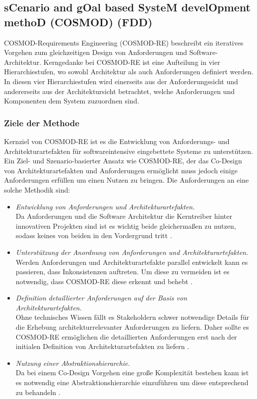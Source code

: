 \subsection{sCenario and gOal based SysteM develOpment methoD (COSMOD) (FDD)}\label{scgo}
COSMOD-Requirements Engineering (COSMOD-RE) beschreibt ein iteratives Vorgehen zum gleichzeitigen Design von Anforderungen und Software-Architektur. Kerngedanke bei COSMOD-RE ist eine Aufteilung in vier Hierarchiestufen, wo sowohl Architektur als auch Anforderungen definiert werden. In diesen vier Hierarchiestufen wird einerseits aus der Anforderungssicht und andererseits aus der Architektursicht betrachtet, welche Anforderungen und Komponenten dem System zuzuordnen sind.\\

\subsubsection{Ziele der Methode}
Kernziel von COSMOD-RE ist es die Entwicklung von Anforderungs- und Architekturartefakten f\"ur softwareintensive eingebettete Systeme zu unterst\"utzen. Ein Ziel- und Szenario-basierter Ansatz wie COSMOD-RE, der das Co-Design von Architekturartefakten und Anforderungen erm\"oglicht muss jedoch einige Anforderungen erf\"ullen um einen Nutzen zu bringen. Die Anforderungen an eine solche Methodik sind: \cite{Poh02}\\
 
\begin{itemize}
\item \emph{Entwicklung von Anforderungen und Architekturartefakten.} \\
Da Anforderungen und die Software Architektur die Kerntreiber hinter innovativen Projekten sind ist es wichtig beide gleicherma\ss{}en zu nutzen, sodass keines von beiden in den Vordergrund tritt \cite{Poh02}.
\item \emph{Unterst\"utzung der Anordnung von Anforderungen und Architekturartefakten.} \\
Werden Anforderungen und Architekturartefakte parallel entwickelt kann es passieren, dass Inkonsistenzen auftreten. Um diese zu vermeiden ist es notwendig, dass COSMOD-RE diese erkennt und behebt \cite{Poh02}.
\item \emph{Definition detaillierter Anforderungen auf der Basis von Architekturartefakten.} \\
Ohne technisches Wissen f\"allt es Stakeholdern schwer notwendige Details f\"ur die Erhebung architekturrelevanter Anforderungen zu liefern. Daher sollte es COSMOD-RE erm\"oglichen die detaillierten Anforderungen erst nach der initialen Definition von Architekturartefakten zu liefern \cite{Poh02}. 
\item \emph{Nutzung einer Abstraktionshierarchie.} \\
Da bei einem Co-Design Vorgehen eine gro\ss{}e Komplexit\"at bestehen kann ist es notwendig eine Abstraktionshierarchie einzuf\"uhren um diese entsprechend zu behandeln \cite{Poh02}.\\
\end{itemize}

